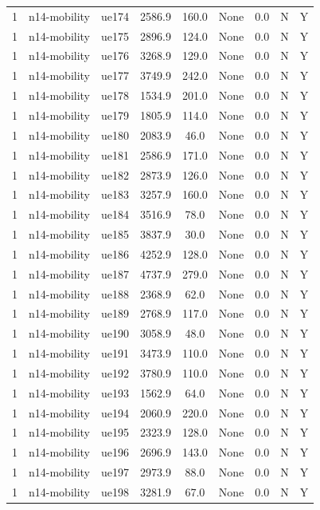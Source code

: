 \begin{table}[ht]
\begin{tabular}{|c|c|c|c|c|c|c|c|c|}
1 & n14-mobility & ue174 & 2586.9 & 160.0 & None & 0.0 & N & Y \\
1 & n14-mobility & ue175 & 2896.9 & 124.0 & None & 0.0 & N & Y \\
1 & n14-mobility & ue176 & 3268.9 & 129.0 & None & 0.0 & N & Y \\
1 & n14-mobility & ue177 & 3749.9 & 242.0 & None & 0.0 & N & Y \\
1 & n14-mobility & ue178 & 1534.9 & 201.0 & None & 0.0 & N & Y \\
1 & n14-mobility & ue179 & 1805.9 & 114.0 & None & 0.0 & N & Y \\
1 & n14-mobility & ue180 & 2083.9 & 46.0 & None & 0.0 & N & Y \\
1 & n14-mobility & ue181 & 2586.9 & 171.0 & None & 0.0 & N & Y \\
1 & n14-mobility & ue182 & 2873.9 & 126.0 & None & 0.0 & N & Y \\
1 & n14-mobility & ue183 & 3257.9 & 160.0 & None & 0.0 & N & Y \\
1 & n14-mobility & ue184 & 3516.9 & 78.0 & None & 0.0 & N & Y \\
1 & n14-mobility & ue185 & 3837.9 & 30.0 & None & 0.0 & N & Y \\
1 & n14-mobility & ue186 & 4252.9 & 128.0 & None & 0.0 & N & Y \\
1 & n14-mobility & ue187 & 4737.9 & 279.0 & None & 0.0 & N & Y \\
1 & n14-mobility & ue188 & 2368.9 & 62.0 & None & 0.0 & N & Y \\
1 & n14-mobility & ue189 & 2768.9 & 117.0 & None & 0.0 & N & Y \\
1 & n14-mobility & ue190 & 3058.9 & 48.0 & None & 0.0 & N & Y \\
1 & n14-mobility & ue191 & 3473.9 & 110.0 & None & 0.0 & N & Y \\
1 & n14-mobility & ue192 & 3780.9 & 110.0 & None & 0.0 & N & Y \\
1 & n14-mobility & ue193 & 1562.9 & 64.0 & None & 0.0 & N & Y \\
1 & n14-mobility & ue194 & 2060.9 & 220.0 & None & 0.0 & N & Y \\
1 & n14-mobility & ue195 & 2323.9 & 128.0 & None & 0.0 & N & Y \\
1 & n14-mobility & ue196 & 2696.9 & 143.0 & None & 0.0 & N & Y \\
1 & n14-mobility & ue197 & 2973.9 & 88.0 & None & 0.0 & N & Y \\
1 & n14-mobility & ue198 & 3281.9 & 67.0 & None & 0.0 & N & Y \\

\end{tabular}
\end{table}
